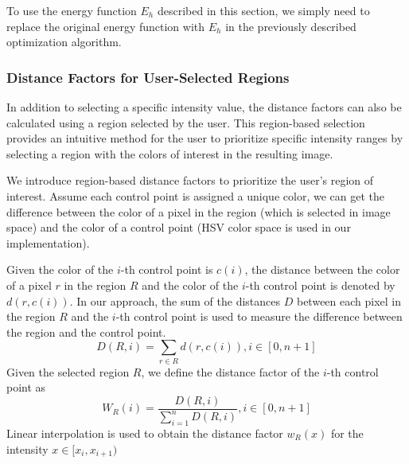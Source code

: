 To use the energy function $ E_{h} $ described in this section, we simply need to replace the original energy function with $ E_{h} $ in the previously described optimization algorithm.



\subsubsection{Distance Factors for User-Selected Regions}
In addition to selecting a specific intensity value, the distance factors can also be calculated using a region selected by the user. This region-based selection provides an intuitive method for the user to prioritize specific intensity ranges by selecting a region with the colors of interest in the resulting image.

We introduce region-based distance factors to prioritize the user's region of interest.
Assume each control point is assigned a unique color, we can get the difference between the color of a pixel in the region (which is selected in image space) and the color of a control point (HSV color space is used in our implementation).

Given the color of the $ i $-th control point is $ c(i) $, the distance between the color of a pixel $ r $ in the region $ R $ and the color of the $ i $-th control point is denoted by $ d(r,c(i)) $. In our approach, the sum of the distances $ D $ between each pixel in the region $ R $ and the $ i $-th control point is used to measure the difference between the region and the control point.
\[ D(R,i)=\sum_{r \in R}d(r,c(i)) , i \in [0,n+1] \]
Given the selected region $ R $, we define the distance factor of the $ i $-th control point as 
\[ W_{R}(i)=\frac{D(R,i)}{\sum_{i=1}^{n}D(R,i)}, i \in [0,n+1] \]
Linear interpolation is used to obtain the distance factor $ w_{R}(x) $ for the intensity $ x \in [x_{i},x_{i+1}) $

